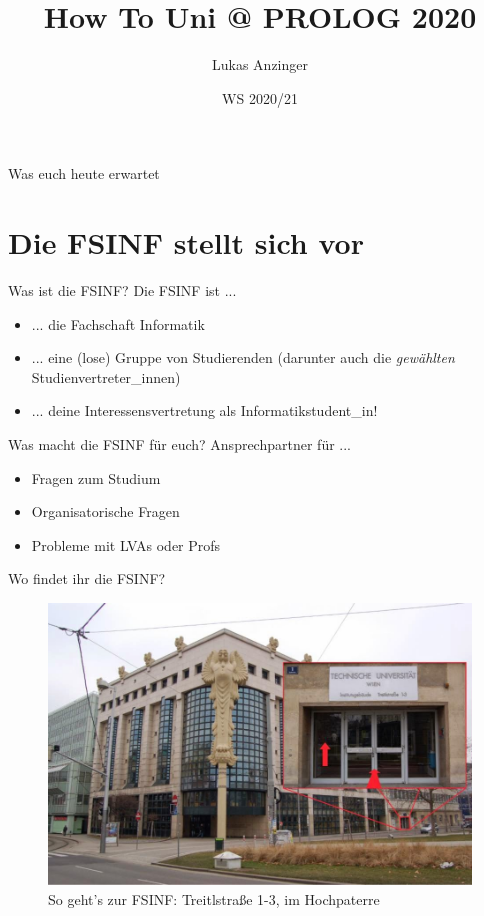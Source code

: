 \documentclass{beamer}
\title{How To Uni @ PROLOG 2020}
\date{WS 2020/21}
\author{Lukas Anzinger}
\begin{document}
\begin{frame}
    \maketitle
\end{frame}

\begin{frame}{Was euch heute erwartet}
    \setcounter{tocdepth}{1}
    \tableofcontents
\end{frame}

\section{Die FSINF stellt sich vor}

\begin{frame}{Was ist die FSINF?}
    Die FSINF ist ...
    \begin{itemize}
        \item ... die Fachschaft Informatik
        \item ... eine (lose) Gruppe von Studierenden (darunter auch die
            \textit{gewählten} Studienvertreter\_innen)
        \item ... deine Interessensvertretung als Informatikstudent\_in!
    \end{itemize}
\end{frame}

\begin{frame}{Was macht die FSINF für euch?}
    Ansprechpartner für ...
    \begin{itemize}
        \item Fragen zum Studium
        \item Organisatorische Fragen
        \item Probleme mit LVAs oder Profs
    \end{itemize}
\end{frame}

\begin{frame}{Wo findet ihr die FSINF?}
    \begin{figure}[htp]
        \centering
        \includegraphics[width=\textwidth]{fsinf.jpg}
        \caption{So geht's zur FSINF: Treitlstraße 1-3, im Hochpaterre}
    \end{figure}
\end{frame}
\end{document}
